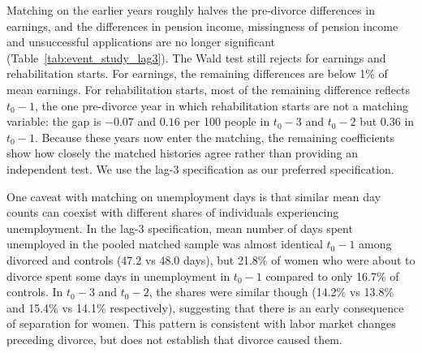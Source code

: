 \documentclass[a4paper,12pt]{article}
\theoremstyle{plain}
\theoremstyle{definition}
\theoremstyle{TheoremNum}
\theoremstyle{CorollaryNum}
\theoremstyle{PropositionNum}
\theoremstyle{TheoremNum}
\begin{document}
{\color{red}
Matching on the earlier years roughly halves the pre-divorce differences in earnings, and the differences in pension income, missingness of pension income and unsuccessful applications are no longer significant (Table~\ref{tab:event_study_lag3}). The Wald test still rejects for earnings and rehabilitation starts. For earnings, the remaining differences are below 1\% of mean earnings. For rehabilitation starts, most of the remaining difference reflects $t_0-1$, the one pre-divorce year in which rehabilitation starts are not a matching variable: the gap is $-0.07$ and $0.16$ per 100 people in $t_0-3$ and $t_0-2$ but $0.36$ in $t_0-1$. Because these years now enter the matching, the remaining coefficients show how closely the matched histories agree rather than providing an independent test. We use the lag-3 specification as our preferred specification.%
}

One caveat with matching on unemployment days is that similar mean day counts can coexist with different shares of individuals experiencing unemployment. In the lag-3 specification, mean number of days spent unemployed in the pooled matched sample was almost identical $t_0-1$ among divorced and controls (47.2 vs 48.0 days), but 21.8\% of women who were about to divorce spent some days in unemployment in $t_0-1$ compared to only 16.7\% of controls.  In $t_0-3$ and $t_0-2$, the shares were similar though (14.2\% vs 13.8\% and 15.4\% vs 14.1\% respectively), suggesting that there is an early consequence of separation for women. This pattern is consistent with labor market changes preceding divorce, but does not establish that divorce caused them.
\end{document}

